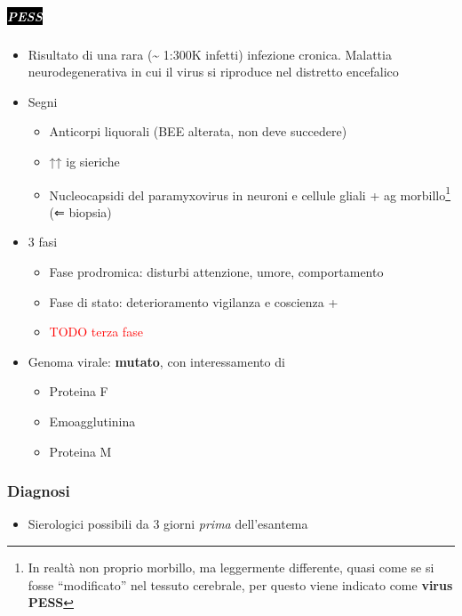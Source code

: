 \documentclass[italian,]{article}
\providecommand{\tightlist}{%
  \setlength{\itemsep}{0pt}\setlength{\parskip}{0pt}}
\newcommand{\pat}[1]{\colorbox{black}{\textcolor{white}{\textsc{#1}}}}
\newcommand{\TODO}[1]{\textcolor{red}{\textsf{\footnotesize{TODO #1}}}} %
\begin{document}
\hypertarget{section-10}{%
\subparagraph{\texorpdfstring{\pat{PESS}}{}}\label{section-10}}

\begin{itemize}
\tightlist
\item
  Risultato di una rara (\textasciitilde{} 1:300K infetti) infezione
  cronica. Malattia neurodegenerativa in cui il virus si riproduce nel
  distretto encefalico
\item
  Segni

  \begin{itemize}
  \tightlist
  \item
    Anticorpi liquorali (BEE alterata, non deve succedere)
  \item
    ↑↑ ig sieriche
  \item
    Nucleocapsidi del paramyxovirus in neuroni e cellule gliali + ag
    morbillo\footnote{In realtà non proprio morbillo, ma leggermente
      differente, quasi come se si fosse ``modificato'' nel tessuto
      cerebrale, per questo viene indicato come \textbf{virus PESS}} (⇐
    biopsia)
  \end{itemize}
\item
  3 fasi

  \begin{itemize}
  \item
    Fase prodromica: disturbi attenzione, umore, comportamento
  \item
    Fase di stato: deterioramento vigilanza e coscienza +
  \item
    \TODO{terza fase}
  \end{itemize}
\item
  Genoma virale: \textbf{mutato}, con interessamento di

  \begin{itemize}
  \tightlist
  \item
    Proteina F
  \item
    Emoagglutinina
  \item
    Proteina M
  \end{itemize}
\end{itemize}

\hypertarget{diagnosi-12}{%
\subsubsection{Diagnosi}\label{diagnosi-12}}

\begin{itemize}
\tightlist
\item
  Sierologici possibili da 3 giorni \emph{prima} dell'esantema
\end{itemize}
\end{document}
